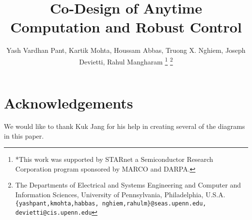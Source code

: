 \documentclass[final,letterpaper, 10 pt, conference]{ieeeconf}  %
\title{\LARGE \bf
Co-Design of Anytime Computation and Robust Control
}
\author{Yash Vardhan Pant, Kartik Mohta, Houssam Abbas, Truong X. Nghiem, Joseph Devietti, Rahul Mangharam%
	\thanks{*This work was supported by STARnet a Semiconductor Research
		Corporation program sponsored by MARCO and DARPA.}%
	\thanks{The Departments of Electrical and Systems Engineering and Computer and Information Sciences, University of Pennsylvania, Philadelphia, U.S.A.
		{\tt\small
			\{yashpant,kmohta,habbas,
			nghiem,rahulm\}@seas.upenn.edu, devietti@cis.upenn.edu}}%
}
\begin{document}
\maketitle
\thispagestyle{empty}
\pagestyle{empty}

{
	
		
}
{
	
	
	
	
	
	
	
	
	
	
	\section*{Acknowledgements}
	We would like to thank Kuk Jang for his help in creating several of the diagrams in this paper.
	

	
}
\end{document}
